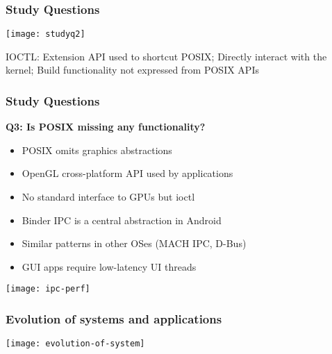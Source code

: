 \begin{frame}[plain]	
	\frametitle{Study Questions}
	\centering
	\texttt{[image: studyq2]}
	
	IOCTL: Extension API used to shortcut POSIX; Directly interact with the kernel; Build functionality not expressed from POSIX APIs
	
\end{frame}


\begin{frame}[plain]	
	\frametitle{Study Questions}
	\Large
	\textbf{Q3: Is POSIX missing any functionality?}
	
	\begin{itemize}\normalsize
		\item POSIX omits graphics abstractions
		
		\item OpenGL cross-platform API used by applications
						
		\item No standard interface to GPUs but ioctl
		\item Binder IPC is a central abstraction in Android
		\item Similar patterns in other OSes (MACH IPC, D-Bus)
		\item GUI apps require low-latency UI threads
		
	\end{itemize}
	\centering
	\texttt{[image: ipc-perf]}
	
\end{frame}


\begin{frame}[plain]	
	\frametitle{Evolution of systems and applications}

	\centering
	\texttt{[image: evolution-of-system]}
	
\end{frame}

